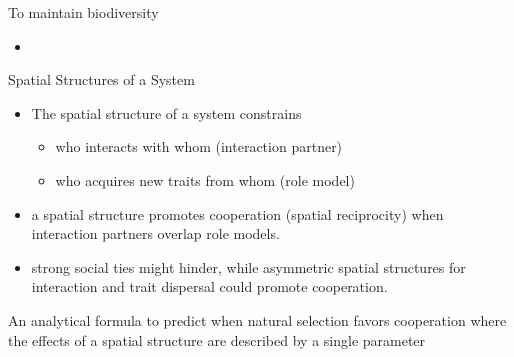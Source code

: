 \begin{frame}{To maintain biodiversity}
    \begin{itemize}
    	\item 
    \end{itemize}
\end{frame}

\begin{frame}{Spatial Structures of a System}
	\begin{itemize}
		\item The spatial structure of a system constrains 
		\begin{itemize}
			\item who interacts with whom (interaction partner) 
			\item who acquires new traits from whom (role model)
		\end{itemize}
		\item a spatial structure promotes cooperation (spatial reciprocity) when interaction partners overlap role models.
		\item strong social ties might hinder, while asymmetric spatial structures for interaction and trait dispersal could promote cooperation.
	\end{itemize}
 An analytical formula to predict when natural selection favors cooperation where the effects of a spatial structure are described by a single parameter
\end{frame}